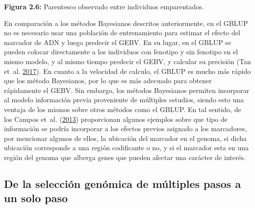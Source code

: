 \documentclass[11pt,spanish,a4paper,oneside,]{book} %
\begin{document}
\begin{center}
\textbf{Figura 2.6:} Parentesco observado entre individuos emparentados.

\end{center}

En comparación a los métodos Bayesianos descritos anteriormente, en el GBLUP no es necesario usar una población de entrenamiento para estimar el efecto del marcador de ADN y luego predecir el GEBV. En su lugar, en el GBLUP se pueden colocar directamente a los individuos con fenotipo y sin fenotipo en el mismo modelo, y al mismo tiempo predecir el GEBV, y calcular su precisión (Tan et~al. \protect\hyperlink{ref-cite:34}{2017}). En cuanto a la velocidad de calculo, el GBLUP es mucho más rápido que los método Bayesianos, por lo que es más adecuado para obtener rápidamente el GEBV. Sin embargo, los métodos Bayesianos permiten incorporar al modelo información previa proveniente de múltiples estudios, siendo esto una ventaja de los mismos sobre otros métodos como el GBLUP. En tal sentido, de los Campos et~al. (\protect\hyperlink{ref-cite:31}{2013}) proporcionan algunos ejemplos sobre que tipo de información se podría incorporar a los efectos previos asignado a los marcadores, por mencionar algunos de ellos, la ubicación del marcador en el genoma, si dicha ubicación corresponde a una región codificante o no, y si el marcador esta en una región del genoma que alberga genes que pueden afectar una carácter de interés.

\hypertarget{de-la-selecciuxf3n-genuxf3mica-de-muxfaltiples-pasos-a-un-solo-paso}{%
\subsection{De la selección genómica de múltiples pasos a un solo paso}\label{de-la-selecciuxf3n-genuxf3mica-de-muxfaltiples-pasos-a-un-solo-paso}}
\end{document}
